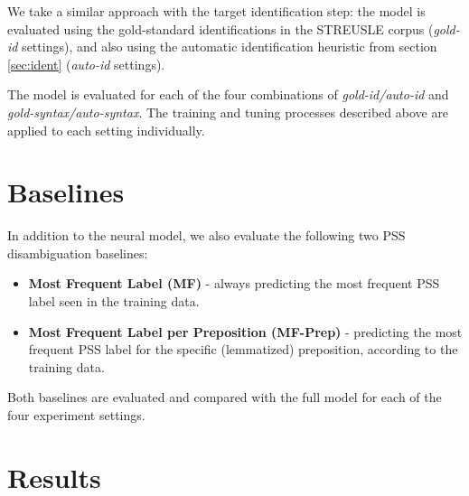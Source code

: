 We take a similar approach with the target identification step: the model is evaluated using the gold-standard identifications in the STREUSLE corpus (\textit{gold-id} settings), and also using the automatic identification heuristic from section \ref{sec:ident} (\textit{auto-id} settings).

The model is evaluated for each of the four combinations of \textit{gold-id/auto-id} and \textit{gold-syntax/auto-syntax}. The training and tuning processes described above are applied to each setting individually.

\section{Baselines} \label{sec:pssbaselines}

In addition to the neural model, we also evaluate the following two PSS disambiguation baselines:

\begin{itemize}
    \item \textbf{Most Frequent Label (MF)} - always predicting the most frequent PSS label seen in the training data.
    \item \textbf{Most Frequent Label per Preposition (MF-Prep)} - predicting the most frequent PSS label for the specific (lemmatized) preposition, according to the training data.
\end{itemize}

Both baselines are evaluated and compared with the full model for each of the four experiment settings. 

\section{Results} \label{sec:pssresults}

